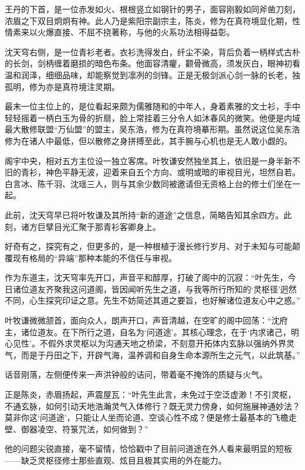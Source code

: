 王丹的下首，是一位赤发如火、根根竖立如钢针的男子，面容刚毅如同斧凿刀刻，浓眉之下双目炯炯有神。此人乃是紫阳宗副宗主，陈炎，修为在真符境显化期，性情素来以火爆直接、不屈不挠著称，与他的火系功法相得益彰。

沈天穹右侧，是一位青衫老者。衣衫洗得发白，纤尘不染，背后负着一柄样式古朴的长剑，剑柄缠着磨损的暗色布条。他面容清癯，颧骨微高，须发灰白，眼神初看温和润泽，细细品味，却能察觉到凛冽的剑锋。正是无极剑派心剑一脉的长老，独孤明，修为亦是真符境注灵期。

最末一位主位上的，是位看起来颇为儒雅随和的中年人，身着素雅的文士衫，手中轻轻摇着一柄白玉为骨的折扇，脸上常挂着三分令人如沐春风的微笑。他便是内域最大散修联盟“万仙盟”的盟主，吴东浩，修为在真符境摹形期。虽然说这位吴东浩修为在诸人中最低，但以散修之身拼搏至此，其手腕与心机也是无人敢小觑的。

阁宇中央，相对五方主位设一独立客席。叶牧谦安然独坐其上，依旧是一身半新不旧的青衫，神色平静无波，迎着来自五个方向、或明或暗的审视目光，坦然自若。白言冰、陈千羽、沈瑶三人，则与其余少数同被邀请但无资格上台的修士们坐在一起。

此前，沈天穹早已将叶牧谦及其所持“新的道途”之信息，简略告知其余四方。此刻，诸方巨擘目光汇聚于那青衫客卿身上。

好奇有之，探究有之，但更多的，是一种根植于漫长修行岁月、对于未知与可能颠覆现有格局的“异端”那种本能的不信任与审视。

\vspace{2em}

作为东道主，沈天穹率先开口，声音平和醇厚，打破了阁中的沉寂：“叶先生，今日诸位道友齐聚我这问道阁，皆因闻听先生之道，与我等所行所知的‘灵枢径’迥然不同，心生探究印证之意。先生不妨简述其道之要旨，也好解诸位道友心中之惑。”

叶牧谦微微颔首，面向众人，朗声开口，声音清越，在空旷的阁中回荡：“沈府主，诸位道友。在下所行之道，自名为‘问道途’。其核心理念，在于‘内求诸己，明心见性’。不假外求灵枢以为沟通天地之桥梁，不刻意开拓体内玄脉以强纳外界灵气，而是于丹田之下，开辟气海，温养调和自身生命本源所生之元气，以此筑基。”

话音刚落，左侧便传来一声洪钟般的诘问，带着毫不掩饰的质疑与火气。

正是陈炎，赤眉扬起，声震屋瓦：“叶先生此言，未免过于空泛虚渺！不引灵枢，不通玄脉，如何引动天地浩瀚灵气入体修行？既无灵力傍身，如何施展神通妙法？莫非你这‘问道途’，只能让人坐而论道、空谈心性不成？便是修士最基本的飞檐走壁、御器凌空、符箓咒法，如何做到？”

他的问题尖锐直接，毫不留情，恰恰戳中了目前问道途在外人看来最明显的短板——缺乏灵枢径修士那些直观、炫目且极其实用的外在能力。

